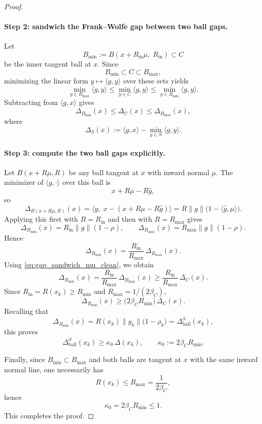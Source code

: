 \documentclass{article}
\begin{document}
\begin{proof}
\paragraph{Step 2: sandwich the Frank--Wolfe gap between two ball gaps.}
Let
\[
B_{\min}:=B(x+R_{\mathrm{in}}\mu,\;R_{\mathrm{in}})\subset C
\]
be the inner tangent ball at $x$. Since
\[
B_{\min}\subset C\subset B_{\max},
\]
minimizing the linear form $y\mapsto \langle g,y\rangle$ over these sets yields
\[
\min_{y\in B_{\max}}\langle g,y\rangle
\le
\min_{y\in C}\langle g,y\rangle
\le
\min_{y\in B_{\min}}\langle g,y\rangle.
\]
Subtracting from $\langle g,x\rangle$ gives
\begin{equation}
\Delta_{B_{\min}}(x)\le \Delta_C(x)\le \Delta_{B_{\max}}(x),
\label{eq:gap_sandwich_mu_clean}
\end{equation}
where
\[
\Delta_S(x):=\langle g,x\rangle-\min_{y\in S}\langle g,y\rangle.
\]

\paragraph{Step 3: compute the two ball gaps explicitly.}
Let $B(x+R\mu,R)$ be any ball tangent at $x$ with inward normal $\mu$.
The minimizer of $\langle g,\cdot\rangle$ over this ball is
\[
x+R\mu-R\hat g,
\]
so
\[
\Delta_{B(x+R\mu,R)}(x)
=
\langle g,\;x-(x+R\mu-R\hat g)\rangle
=
R\|g\|\bigl(1-\langle \hat g,\mu\rangle\bigr).
\]
Applying this first with $R=R_{\mathrm{in}}$ and then with $R=R_{\max}$ gives
\[
\Delta_{B_{\min}}(x)=R_{\mathrm{in}}\|g\|(1-\rho),
\qquad
\Delta_{B_{\max}}(x)=R_{\max}\|g\|(1-\rho).
\]
Hence
\[
\Delta_{B_{\min}}(x)
=
\frac{R_{\mathrm{in}}}{R_{\max}}\,\Delta_{B_{\max}}(x).
\]
Using \eqref{eq:gap_sandwich_mu_clean}, we obtain
\[
\Delta_{B_{\min}}(x)
=
\frac{R_{\mathrm{in}}}{R_{\max}}\,\Delta_{B_{\max}}(x)
\ge
\frac{R_{\mathrm{in}}}{R_{\max}}\,\Delta_C(x).
\]
Since $R_{\mathrm{in}}=R(x_k)\ge R_{\min}$ and $R_{\max}=1/(2\beta_C)$,
\[
\Delta_{B_{\min}}(x)\ge
\bigl(2\beta_C R_{\min}\bigr)\,\Delta_C(x).
\]
Recalling that
\[
\Delta_{B_{\min}}(x)
=
R(x_k)\|g_k\|\bigl(1-\rho_k\bigr)
=
\Delta_{\mathrm{ball}}^{\partial}(x_k),
\]
this proves
\[
\Delta_{\mathrm{ball}}^{\partial}(x_k)\ge \kappa_0\,\Delta(x_k),
\qquad
\kappa_0:=2\beta_C R_{\min}.
\]

Finally, since $B_{\min}\subset B_{\max}$ and both balls are tangent at $x$ with the same inward normal line, one necessarily has
\[
R(x_k)\le R_{\max}=\frac{1}{2\beta_C},
\]
hence
\[
\kappa_0=2\beta_C R_{\min}\le 1.
\]
This completes the proof.
\end{proof}
\end{document}

